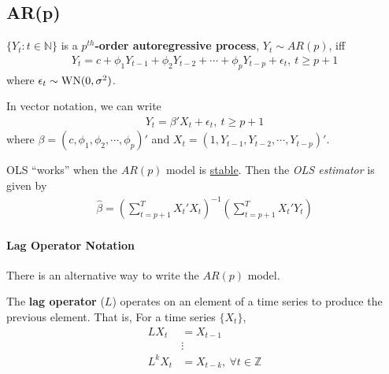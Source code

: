 \documentclass[11pt]{elegantbook}
\begin{document}
\subsection{AR(p)}
\begin{definition}[AR(p)]
    $\{Y_t:t\in \mathbb{N}\}$ is a \textbf{$p^{th}$-order autoregressive process}, $Y_t\sim AR(p)$, iff
    \begin{equation}
        \begin{aligned}
            Y_t=c+\phi_1 Y_{t-1}+\phi_2 Y_{t-2}+\cdots+\phi_p Y_{t-p}+\epsilon_t,\ t\geq p+1
        \end{aligned}
        \nonumber
    \end{equation}
    where $\epsilon_t\sim \textnormal{WN}(0,\sigma^2)$.
\end{definition}
In vector notation, we can write
\begin{equation}
    \begin{aligned}
        Y_t=\beta'X_t+\epsilon_t,\ t\geq p+1
    \end{aligned}
    \nonumber
\end{equation}
where $\beta=(c,\phi_1,\phi_2,\cdots,\phi_p)'$ and $X_t=(1,Y_{t-1},Y_{t-2},\cdots,Y_{t-p})'$.
\begin{claim}
    OLS ``works'' when the $AR(p)$ model is \underline{stable}. Then the \textit{OLS estimator} is given by
    \begin{equation}
        \begin{aligned}
            \hat{\beta}=(\sum_{t=p+1}^TX_t'X_t)^{-1}(\sum_{t=p+1}^TX_t'Y_t)
        \end{aligned}
        \nonumber
    \end{equation}
\end{claim}


\paragraph*{Lag Operator Notation} There is an alternative way to write the $AR(p)$ model.
\begin{definition}
    The \textbf{lag operator} ($L$) operates on an element of a time series to produce the previous element. That is, For a time series $\{X_t\}$,
    \begin{equation}
        \begin{aligned}
            L X_t&=X_{t-1}\\
            &\vdots\\
            L^k X_t&=X_{t-k},\ \forall t\in \mathbb{Z}
        \end{aligned}
        \nonumber
    \end{equation}
\end{definition}
\end{document}
